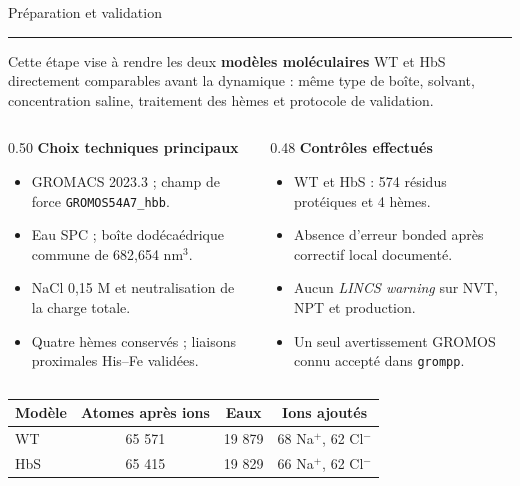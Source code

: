 \documentclass[aspectratio=169,10pt]{beamer}
\newcommand{\slidetitleline}{\par\vspace{-0.3em}\noindent\textcolor{UniBlue}{\rule{\linewidth}{0.7pt}}\par\vspace{0.25em}}
\begin{document}
\begin{frame}{Préparation et validation}
\slidetitleline
\small
Cette étape vise à rendre les deux \textbf{modèles moléculaires} WT et HbS directement comparables avant la dynamique : même type de boîte, solvant, concentration saline, traitement des hèmes et protocole de validation.

\vspace{0.55em}
\begin{columns}[T,totalwidth=\textwidth]
\begin{column}{0.50\textwidth}
\textbf{Choix techniques principaux}\par
\footnotesize
\begin{itemize}
  \item GROMACS 2023.3 ; champ de force \texttt{GROMOS54A7\_hbb}.
  \item Eau SPC ; boîte dodécaédrique commune de 682,654 nm\(^3\).
  \item NaCl 0,15 M et neutralisation de la charge totale.
  \item Quatre hèmes conservés ; liaisons proximales His--Fe validées.
\end{itemize}
\end{column}
\begin{column}{0.48\textwidth}
\textbf{Contrôles effectués}\par
\footnotesize
\begin{itemize}
  \item WT et HbS : 574 résidus protéiques et 4 hèmes.
  \item Absence d'erreur bonded après correctif local documenté.
  \item Aucun \textit{LINCS warning} sur NVT, NPT et production.
  \item Un seul avertissement GROMOS connu accepté dans \texttt{grompp}.
\end{itemize}
\end{column}
\end{columns}

\vspace{0.45em}
\centering
\scriptsize
\begin{tabular}{lccc}
\toprule
Modèle & Atomes après ions & Eaux & Ions ajoutés \\
\midrule
WT & 65 571 & 19 879 & 68 Na\(^+\), 62 Cl\(^-\) \\
HbS & 65 415 & 19 829 & 66 Na\(^+\), 62 Cl\(^-\) \\
\bottomrule
\end{tabular}
\end{frame}
\end{document}
